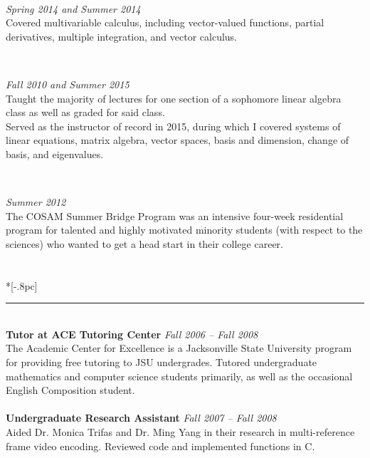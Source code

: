 \documentclass{article}
\begin{document}
\

 \hfill {\it Spring 2014 and Summer 2014}\\
Covered multivariable calculus, including vector-valued
functions, partial derivatives, multiple integration, and vector
calculus. 

\

 \hfill {\it Fall 2010 and Summer 2015}\\
Taught the majority of lectures for one section of a sophomore linear algebra
class as well as graded for said class.\\ Served as the instructor of record in
2015, during which I covered systems of linear equations, matrix algebra, vector
spaces, basis and dimension, change of basis, and eigenvalues.

\

 \hfill {\it Summer 2012}\\
The COSAM Summer Bridge Program was an intensive four-week residential
program for talented and highly motivated minority students (with
respect to the sciences) who wanted to get a head start in their college career.\\
\\
 \\*[-.8pc]
\rule{\textwidth}{.1pt} \\
{\bf Tutor at ACE Tutoring Center} \hfill \textit{Fall 2006 -- Fall 2008}\\
The Academic Center for Excellence is a Jacksonville State University program
for providing free tutoring to JSU undergrades. Tutored undergraduate
mathematics and computer science students primarily, as
well as the occasional English Composition student.\\
\\
{\bf Undergraduate Research Assistant} \hfill {\it Fall 2007 -- Fall 2008} \\
Aided Dr. Monica Trifas and Dr. Ming Yang in their research in multi-reference
frame video encoding. Reviewed code and implemented functions in C.\\
\end{document}
